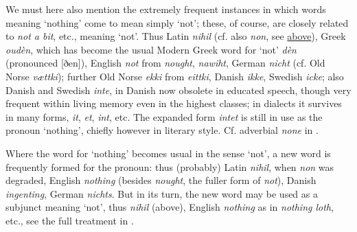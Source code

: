 \label{para:inte}We must here also mention the extremely frequent instances in which words meaning `nothing' come to mean simply `not'; these, of course, are closely related to \textit{not a bit}, etc., meaning `not'. Thus Latin \textit{nihil} (cf. also \textit{non}, see \hyperref[para:non]{above}), Greek \textit{oudèn}, which has become the usual Modern Greek word for `not' \textit{dèn} (pronounced [ðen]), %
English \textit{not} from \textit{nought}, \textit{nawiht}, German \textit{nicht} (cf. Old Norse \textit{vættki}); further Old Norse \textit{ekki} from \textit{eittki}, Danish \textit{ikke}, Swedish \textit{icke}; also Danish and Swedish \textit{inte}, in Danish now obsolete in educated speech, though very frequent within living memory even in the highest classes; in dialects it survives in many forms, \textit{it}, \textit{et}, \textit{int}, etc. The expanded form \textit{intet} is still in use as the pronoun `nothing', chiefly however in literary style. Cf. adverbial \textit{none} in \citet[\href{https://archive.org/details/jespersen-1954-a-modern-english-grammar-on-historical-principles-part-ii-syntax-first-volume/page/424/mode/2up?view=theater}{16.69}]{jespersenMEG2}.

Where the word for `nothing' becomes usual in the sense `not', a new word is frequently formed for the pronoun: thus (probably) Latin \textit{nihil}, when \textit{non} was degraded, English \textit{nothing} (besides \textit{nought}, the fuller form of \textit{not}), Danish \textit{ingenting}, German \textit{nichts}. But in its turn, the new word may be used as a subjunct meaning `not', thus \textit{nihil} (above), %
English \textit{nothing} as in \textit{nothing loth}, etc., see the full treatment in \citet[\href{https://archive.org/details/jespersen-1954-a-modern-english-grammar-on-historical-principles-part-ii-syntax-first-volume/page/424/mode/2up?view=theater}{17.36ff}]{jespersenMEG2}. 

